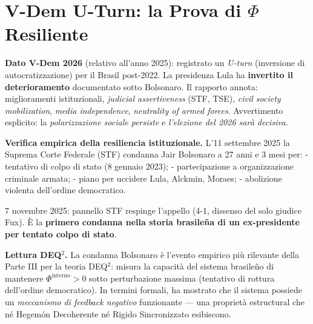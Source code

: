 \section{\texorpdfstring{V-Dem U-Turn: la Prova di \(\Phi\)
Resiliente}{V-Dem U-Turn: la Prova di \textbackslash Phi Resiliente}}\label{v-dem-u-turn-la-prova-di-phi-resiliente}

\Proved{} \textbf{Dato V-Dem 2026} (relativo all'anno 2025): registrato
un \emph{U-turn} (inversione di autocratizzazione) per il Brasil
post-2022. La presidenza Lula ha \textbf{invertito il deterioramento}
documentato sotto Bolsonaro. Il rapporto annota: miglioramenti
istituzionali, \emph{judicial assertiveness} (STF, TSE), \emph{civil
society mobilization}, \emph{media independence}, \emph{neutrality of
armed forces}. Avvertimento esplicito: la \emph{polarizzazione sociale
persiste} e \emph{l'elezione del 2026 sarà decisiva}.

\Proved{} \textbf{Verifica empirica della resiliencia istituzionale.}
L'11 settembre 2025 la Suprema Corte Federale (STF) condanna Jair
Bolsonaro a 27 anni e 3 mesi per: - tentativo di colpo di stato (8
gennaio 2023); - partecipazione a organizzazione criminale armata; -
piano per uccidere Lula, Alckmin, Moraes; - abolizione violenta
dell'ordine democratico.

7 novembre 2025: pannello STF respinge l'appello (4-1, dissenso del solo
giudice Fux). È la \textbf{primero condanna nella storia brasileña di un
ex-presidente per tentato colpo di stato}.

\Hypoth{} \textbf{Lettura DEQ$^2$. } La condanna Bolsonaro è l'evento
empirico più rilevante della Parte III per la teoria DEQ$^2$: misura la
capacità del sistema brasileño di mantenere
\(\Phi^{\text{interno}} > 0\) sotto perturbazione massima (tentativo di
rottura dell'ordine democratico). In termini formali, ha mostrato che il
sistema possiede un \emph{meccanismo di feedback negativo} funzionante
--- una proprietà estructural che né Hegemón Decoherente né Rigido
Sincronizzato esibiscono.

